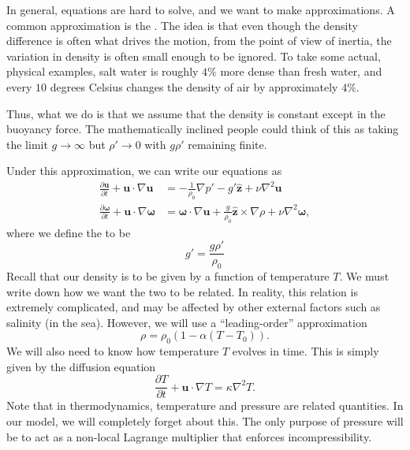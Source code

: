 \documentclass[a4paper]{article}
\begin{document}

In general, equations are hard to solve, and we want to make approximations. A common approximation is the . The idea is that even though the density difference is often what drives the motion, from the point of view of inertia, the variation in density is often small enough to be ignored. To take some actual, physical examples, salt water is roughly $4\%$ more dense than fresh water, and every $10$ degrees Celsius changes the density of air by approximately $4\%$.

Thus, what we do is that we assume that the density is constant except in the buoyancy force. The mathematically inclined people could think of this as taking the limit $g \to \infty$ but $\rho' \to 0$ with $g \rho'$ remaining finite.

Under this approximation, we can write our equations as
\begin{align*}
  \frac{\partial \mathbf{u}}{\partial t} + \mathbf{u}\cdot \nabla \mathbf{u} &= - \frac{1}{\rho_0} \nabla p' - g' \hat{\mathbf{z}} + \nu \nabla^2 \mathbf{u}\\
  \frac{\partial \boldsymbol\omega}{\partial t} + \mathbf{u} \cdot \nabla\boldsymbol\omega &= \boldsymbol\omega \cdot \nabla \mathbf{u} + \frac{g}{\rho_0} \hat{\mathbf{z}} \times \nabla \rho + \nu \nabla^2 \boldsymbol\omega,
\end{align*}
where we define the  to be
\[
  g' = \frac{g \rho'}{\rho_0}
\]
Recall that our density is to be given by a function of temperature $T$. We must write down how we want the two to be related. In reality, this relation is extremely complicated, and may be affected by other external factors such as salinity (in the sea). However, we will use a ``leading-order'' approximation
\[
  \rho = \rho_0 (1 - \alpha(T - T_0)).
\]
We will also need to know how temperature $T$ evolves in time. This is simply given by the diffusion equation
\[
  \frac{\partial T}{\partial t} + \mathbf{u} \cdot \nabla T = \kappa \nabla^2 T.
\]
Note that in thermodynamics, temperature and pressure are related quantities. In our model, we will completely forget about this. The only purpose of pressure will be to act as a non-local Lagrange multiplier that enforces incompressibility.
\end{document}
